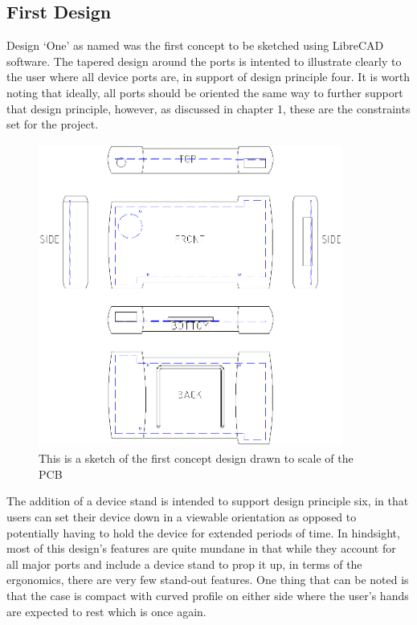 \subsection{First Design}


Design ‘One’ as named was the first concept to be sketched using LibreCAD software.
The tapered design around the ports is intented to illustrate clearly to the user where all device ports are, in support of design principle four. 
It is worth noting that ideally, all ports should be oriented the same way to further support that design principle, however, as discussed in chapter 1, these are the constraints set for the project.

\begin{figure} [h]
\centering
\includegraphics[width=10cm,height=10cm,keepaspectratio]{Figures/design1_sketch.png}
\caption{This is a sketch of the first concept design drawn to scale of the PCB}
\label{fig:Design_1}
\end{figure}

The addition of a device stand is intended to support design principle six, in that users can set their device down in a viewable orientation as opposed to potentially having to hold the device for extended periods of time.
In hindsight, most of this design’s features are quite mundane in that while they account for all major ports and include a device stand to prop it up, in terms of the ergonomics, there are very few stand-out features. 
One thing that can be noted is that the case is compact with curved profile on either side where the user’s hands are expected to rest which is once again.

